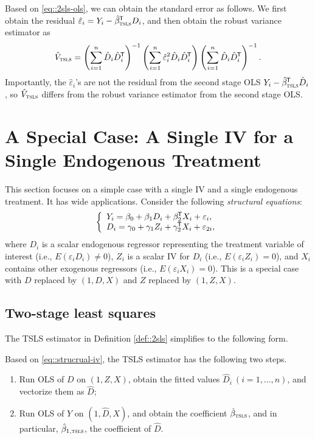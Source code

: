 Based on \eqref{eq::2sls-ols}, we can obtain the standard error as follows. We first obtain the residual $\hat{\varepsilon}_i = Y_i - \hat{\beta}_\textsc{tsls}^{\mkern-1.5mu\mathsf{T}} D_i$, and then obtain the robust variance estimator as
$$
\hat{V}_\textsc{tsls} = \left( \sum_{i=1}^n  \hat{D}_i \hat{D}_i^{\mkern-1.5mu\mathsf{T}}  \right)^{-1}
 \left( \sum_{i=1}^n \hat{\varepsilon}_i ^2  \hat{D}_i \hat{D}_i^{\mkern-1.5mu\mathsf{T}}  \right)
\left( \sum_{i=1}^n  \hat{D}_i \hat{D}_i^{\mkern-1.5mu\mathsf{T}}  \right)^{-1} . 
$$
Importantly, the $\hat{\varepsilon}_i$'s  are
not the residual from the second stage OLS $  Y_i - \hat{\beta}_\textsc{tsls}^{\mkern-1.5mu\mathsf{T}} \hat{D}_i $, so $\hat{V}_\textsc{tsls} $ differs from the robust variance estimator from the second stage OLS. 




\section{A Special Case: A Single IV for a Single Endogenous Treatment}


This section focuses on a simple case with a single IV and a single endogenous treatment. It has wide applications. 
Consider the following {\it structural equations}:
\begin{eqnarray}
\label{eq::strucrual-iv}
\left\{
\begin{array}{l}
Y_i = \beta_0 + \beta_1 D_i + \beta_2\tran X_i + \varepsilon_{i},\\
D_i = \gamma_0 + \gamma_1 Z_i + \gamma_2 \tran X_i + \varepsilon_{2i},
\end{array}
\right.
\end{eqnarray}
where $D_i$ is a scalar endogenous regressor representing the treatment variable of interest (i.e., $E(\varepsilon_{i} D_i) \neq 0$), $Z_i$ is a scalar IV for $D_i$ (i.e., $E(\varepsilon_{i} Z_i) = 0$), and $X_i$ contains other exogenous regressors (i.e., $E(\varepsilon_{i} X_i) = 0$). This is a special case with $D$ replaced by $(1, D, X)$ and $Z$ replaced by $(1, Z, X)$. 



\subsection{Two-stage least squares}

The TSLS estimator in Definition \ref{def::2sls} simplifies to the following form. 

\begin{definition}
\label{def::tsls-single}
Based on \eqref{eq::strucrual-iv}, the TSLS estimator has the following two steps.
\begin{enumerate}
\item
Run OLS of $D$ on $(1, Z,X)$, obtain the fitted values $\hat{D}_i\ (i=1,\ldots, n)$, and vectorize them as $\hat{D}$; 

\item 
Run OLS of $Y$ on $(1, \hat{D}, X)$, and obtain the coefficient $\hat{\beta}_\textsc{tsls}$, and in particular, $\hat{\beta}_{1,\textsc{tsls}}$, the coefficient of $\hat{D}$. 
\end{enumerate}
\end{definition}



